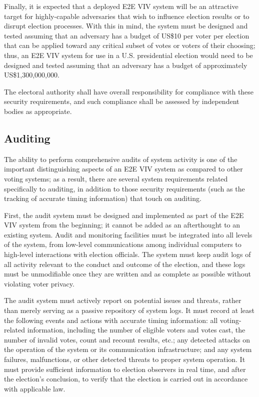 Finally, it is expected that a deployed E2E VIV system will be an
attractive target for highly-capable adversaries that wish to
influence election results or to disrupt election processes. With this
in mind, the system must be designed and tested assuming that an
adversary has a budget of US\$10 per voter per election that can be
applied toward any critical subset of votes or voters of their
choosing; thus, an E2E VIV system for use in a U.S. presidential
election would need to be designed and tested assuming that an
adversary has a budget of approximately US\$1,300,000,000.

The electoral authority shall have overall responsibility for
compliance with these security requirements, and such compliance shall
be assessed by independent bodies as appropriate.

\subsection{Auditing}

The ability to perform comprehensive audits of system activity is one
of the important distinguishing aspects of an E2E VIV system as
compared to other voting systems; as a result, there are several
system requirements related specifically to auditing, in addition to
those security requirements (such as the tracking of accurate timing
information) that touch on auditing.

First, the audit system must be designed and implemented as part of
the E2E VIV system from the beginning; it cannot be added as an
afterthought to an existing system. Audit and monitoring facilities
must be integrated into all levels of the system, from low-level
communications among individual computers to high-level interactions
with election officials. The system must keep audit logs of all
activity relevant to the conduct and outcome of the election, and
these logs must be unmodifiable once they are written and as complete
as possible without violating voter privacy.

The audit system must actively report on potential issues and threats,
rather than merely serving as a passive repository of system logs. It
must record at least the following events and actions with accurate
timing information: all voting-related information, including the
number of eligible voters and votes cast, the number of invalid votes,
count and recount results, etc.; any detected attacks on the operation
of the system or its communication infrastructure; and any system
failures, malfunctions, or other detected threats to proper system
operation. It must provide sufficient information to election
observers in real time, and after the election's conclusion, to verify
that the election is carried out in accordance with applicable
law.

